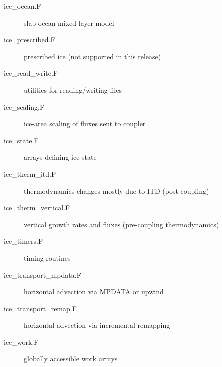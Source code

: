 \begin{description}
  \item [ice\_ocean.F]              slab ocean mixed layer model
  \item [ice\_prescribed.F]         prescribed ice (not supported in this release)
  \item [ice\_read\_write.F]        utilities for reading/writing files
  \item [ice\_scaling.F]            ice-area scaling of fluxes sent to coupler
  \item [ice\_state.F]              arrays defining ice state 
  \item [ice\_therm\_itd.F]         thermodynamics changes mostly due to ITD (post-coupling)
  \item [ice\_therm\_vertical.F]    vertical growth rates and fluxes (pre-coupling thermodynamics)
  \item [ice\_timers.F]             timing routines 
  \item [ice\_transport\_mpdata.F]  horizontal advection via MPDATA or upwind
  \item [ice\_transport\_remap.F]   horizontal advection via incremental remapping
  \item [ice\_work.F]               globally accessible work arrays
\end{description}
